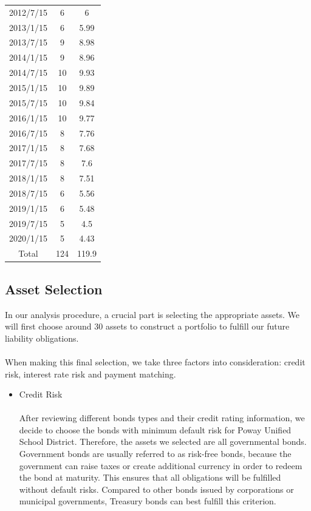 \documentclass[oneside,12pt]{report}
\begin{document}
{\begin{table}[htbp]
\begin{tabular}{|c|c|c|}
    2012/7/15 & 6     & 6 \\
    2013/1/15 & 6     & 5.99 \\
    2013/7/15 & 9     & 8.98 \\
    2014/1/15 & 9     & 8.96 \\
    2014/7/15 & 10    & 9.93 \\
    2015/1/15 & 10    & 9.89 \\
    2015/7/15 & 10    & 9.84 \\
    2016/1/15 & 10    & 9.77 \\
    2016/7/15 & 8     & 7.76 \\
    2017/1/15 & 8     & 7.68 \\
    2017/7/15 & 8     & 7.6 \\
    2018/1/15 & 8     & 7.51 \\
    2018/7/15 & 6     & 5.56 \\
    2019/1/15 & 6     & 5.48 \\
    2019/7/15 & 5     & 4.5 \\
    2020/1/15 & 5     & 4.43 \\\hline
    Total   & 124   & 119.9 \\\hline
    \end{tabular}
  \label{tab:pv}
\end{table}
\newpage
\subsection{Asset Selection}
\vspace{8pt}
In our analysis procedure, a crucial part is selecting the appropriate assets. We will first choose around 30 assets to construct a portfolio to fulfill our future liability obligations. \\
\\
When making this final selection, we take three factors into consideration: credit risk, interest rate risk and payment matching.\\
\begin{itemize}
\item Credit Risk\\
\\
\noindent After reviewing different bonds types and their credit rating information, we decide to choose the bonds with minimum default risk for Poway Unified School District. Therefore, the assets we selected are all governmental bonds. Government bonds are usually referred to as risk-free bonds, because the government can raise taxes or create additional currency in order to redeem the bond at maturity. This ensures that all obligations will be fulfilled without default risks. Compared to other bonds issued by corporations or municipal governments, Treasury bonds can best fulfill this criterion.\\


\end{itemize}}
\end{document}
